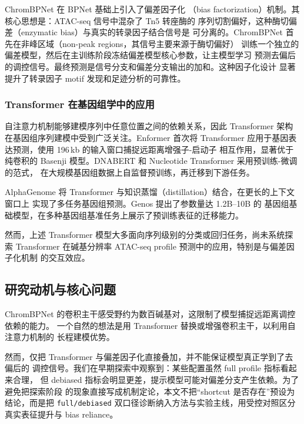 \documentclass[11pt,a4paper]{ctexart}
\begin{document}
ChromBPNet\cite{pampari2023chrombpnet} 在 BPNet 基础上引入了偏差因子化
（bias factorization）机制。其核心思想是：ATAC-seq 信号中混杂了 Tn5 转座酶的
序列切割偏好，这种酶切偏差（enzymatic bias）与真实的转录因子结合信号是
可分离的。ChromBPNet 首先在非峰区域（non-peak regions，其信号主要来源于酶切偏好）
训练一个独立的偏差模型，然后在主训练阶段冻结偏差模型核心参数，让主模型学习
预测去偏后的调控信号。最终预测是信号分支和偏差分支输出的加和。这种因子化设计
显著提升了转录因子 motif 发现和足迹分析的可靠性。

\subsubsection{Transformer 在基因组学中的应用}

自注意力机制能够建模序列中任意位置之间的依赖关系，因此 Transformer 架构
在基因组序列建模中受到广泛关注。Enformer\cite{avsec2021effective} 首次将
Transformer 应用于基因表达预测，使用 196\,kb 的输入窗口捕捉远距离增强子-启动子
相互作用，显著优于纯卷积的 Basenji 模型。DNABERT\cite{ji2021dnabert} 和
Nucleotide Transformer\cite{dallachiesa2023nucleotide} 采用预训练-微调的范式，
在大规模基因组数据上自监督预训练，再迁移到下游任务。

AlphaGenome 将 Transformer 与知识蒸馏（distillation）结合，在更长的上下文窗口上
实现了多任务基因组预测。Genos\cite{genos2025} 提出了参数量达 1.2B--10B 的
基因组基础模型，在多种基因组基准任务上展示了预训练表征的迁移能力。

然而，上述 Transformer 模型大多面向序列级别的分类或回归任务，尚未系统探索
Transformer 在碱基分辨率 ATAC-seq profile 预测中的应用，特别是与偏差因子化机制
的交互效应。

\subsection{研究动机与核心问题}
\label{sec:motivation}

ChromBPNet 的卷积主干感受野约为数百碱基对，这限制了模型捕捉远距离调控依赖的能力。
一个自然的想法是用 Transformer 替换或增强卷积主干，以利用自注意力机制的
长程建模优势。

然而，仅把 Transformer 与偏差因子化直接叠加，并不能保证模型真正学到了去偏后的
调控信号。我们在早期探索中观察到：某些配置虽然 full profile 指标看起来合理，
但 debiased 指标会明显更差，提示模型可能对偏差分支产生依赖。为了避免把探索阶段
的现象直接写成机制定论，本文不把“shortcut 是否存在”预设为结论，而是把
\texttt{full/debiased} 双口径诊断纳入方法与实验主线，用受控对照区分真实表征提升与
bias reliance。
\end{document}

